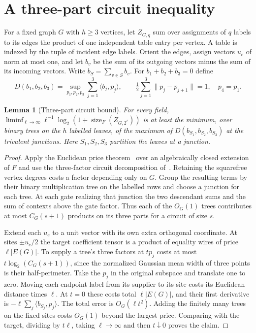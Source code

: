 \documentclass[11pt]{article}
\newtheorem{lemma}[theorem]{Lemma}
\theoremstyle{remark}
\newcommand{\sizeF}{\operatorname{size}_F}
\begin{document}
\section{A three-part circuit inequality}\label{geometry}
For a fixed graph $G$ with $h\ge3$ vertices, let $Z_{G,q}$ sum over assignments of $q$ labels to its edges the product of one independent table entry per vertex. A table is indexed by the tuple of incident edge labels. Orient the edges, assign vectors $u_e$ of norm at most one, and let $b_v$ be the sum of its outgoing vectors minus the sum of its incoming vectors. Write $b_S=\sum_{v\in S}b_v$. For $b_1+b_2+b_3=0$ define
\[
 D(b_1,b_2,b_3)=\sup_{p_1,p_2,p_3}\sum_{j=1}^3\langle b_j,p_j\rangle,
 \qquad \tfrac12\sum_{j=1}^3\|p_j-p_{j+1}\|=1,\quad p_4=p_1 .
\]
\begin{lemma}[Three-part circuit bound]\label{wire}
For every field, $\liminf_{\ell\to\infty}\ell^{-1}\log_2(1+\sizeF(Z_{G,2^\ell}))$ is at least the minimum, over binary trees on the $h$ labelled leaves, of the maximum of $D(b_{S_1},b_{S_2},b_{S_3})$ at the trivalent junctions. Here $S_1,S_2,S_3$ partition the leaves at a junction.
\end{lemma}
\begin{proof}
Apply the Euclidean price theorem~\cite{euclid} over an algebraically closed extension of $F$ and use the three-factor circuit decomposition of~\cite{sharp-width-bases}. Retaining the squarefree vertex degrees costs a factor depending only on $G$. Group the resulting terms by their binary multiplication tree on the labelled rows and choose a junction for each tree. At each gate realizing that junction the two descendant sums and the sum of contexts above the gate factor. Thus each of the $O_G(1)$ trees contributes at most $C_G(s+1)$ products on its three parts for a circuit of size $s$.

Extend each $u_e$ to a unit vector with its own extra orthogonal coordinate. At sites $\pm u_e/2$ the target coefficient tensor is a product of equality wires of price $\ell |E(G)|$. To supply a tree's three factors at $t p_j$ costs at most $t\log_2(C_G(s+1))$, since the normalized Gaussian mean width of three points is their half-perimeter. Take the $p_j$ in the original subspace and translate one to zero. Moving each endpoint label from its supplier to its site costs its Euclidean distance times $\ell$. At $t=0$ these costs total $\ell|E(G)|$, and their first derivative is $-\ell\sum_j\langle b_{S_j},p_j\rangle$. The total error is $O_G(\ell t^2)$. Adding the finitely many trees on the fixed sites costs $O_G(1)$ beyond the largest price. Comparing with the target, dividing by $t\ell$, taking $\ell\to\infty$ and then $t\downarrow0$ proves the claim.
\end{proof}
\end{document}
